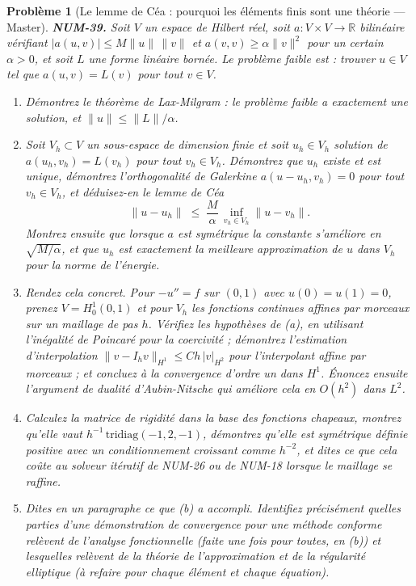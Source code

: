\documentclass[11pt]{article}
\newtheorem{problem}{Problème}
\begin{document}
\begin{problem}[{Le lemme de Céa : pourquoi les éléments finis sont une théorie --- Master}]
\textbf{NUM-39.} Soit $V$ un espace de Hilbert réel, soit $a : V \times V \to \mathbb{R}$ bilinéaire vérifiant
$|a(u,v)| \le M\|u\|\,\|v\|$ et $a(v,v) \ge \alpha\|v\|^2$ pour un certain $\alpha > 0$, et soit $L$ une forme linéaire bornée. Le problème faible est : trouver $u \in V$ tel que $a(u,v) = L(v)$ pour tout $v \in V$.
\begin{enumerate}
\item[(a)] Démontrez le théorème de Lax-Milgram : le problème faible a exactement une solution, et $\|u\| \le \|L\|/\alpha$.
\item[(b)] Soit $V_h \subset V$ un sous-espace de dimension finie et soit $u_h \in V_h$ solution de $a(u_h, v_h) = L(v_h)$ pour tout $v_h \in V_h$. Démontrez que $u_h$ existe et est unique, démontrez l'orthogonalité de Galerkine $a(u - u_h, v_h) = 0$ pour tout $v_h \in V_h$, et déduisez-en le lemme de Céa
\[ \|u - u_h\| \;\le\; \frac{M}{\alpha}\, \inf_{v_h \in V_h} \|u - v_h\| . \]
Montrez ensuite que lorsque $a$ est symétrique la constante s'améliore en $\sqrt{M/\alpha}$, et que $u_h$ est exactement la meilleure approximation de $u$ dans $V_h$ pour la norme de l'énergie.
\item[(c)] Rendez cela concret. Pour $-u'' = f$ sur $(0,1)$ avec $u(0) = u(1) = 0$, prenez $V = H^1_0(0,1)$ et pour $V_h$ les fonctions continues affines par morceaux sur un maillage de pas $h$. Vérifiez les hypothèses de (a), en utilisant l'inégalité de Poincaré pour la coercivité ; démontrez l'estimation d'interpolation $\|v - I_h v\|_{H^1} \le C h \,|v|_{H^2}$ pour l'interpolant affine par morceaux ; et concluez à la convergence d'ordre un dans $H^1$. Énoncez ensuite l'argument de dualité d'Aubin-Nitsche qui améliore cela en $O(h^2)$ dans $L^2$.
\item[(d)] Calculez la matrice de rigidité dans la base des fonctions chapeaux, montrez qu'elle vaut $h^{-1}\,\mathrm{tridiag}(-1, 2, -1)$, démontrez qu'elle est symétrique définie positive avec un conditionnement croissant comme $h^{-2}$, et dites ce que cela coûte au solveur itératif de NUM-26 ou de NUM-18 lorsque le maillage se raffine.
\item[(e)] Dites en un paragraphe ce que (b) a accompli. Identifiez précisément quelles parties d'une démonstration de convergence pour une méthode conforme relèvent de l'analyse fonctionnelle (faite une fois pour toutes, en (b)) et lesquelles relèvent de la théorie de l'approximation et de la régularité elliptique (à refaire pour chaque élément et chaque équation).
\end{enumerate}

\end{problem}
\end{document}
